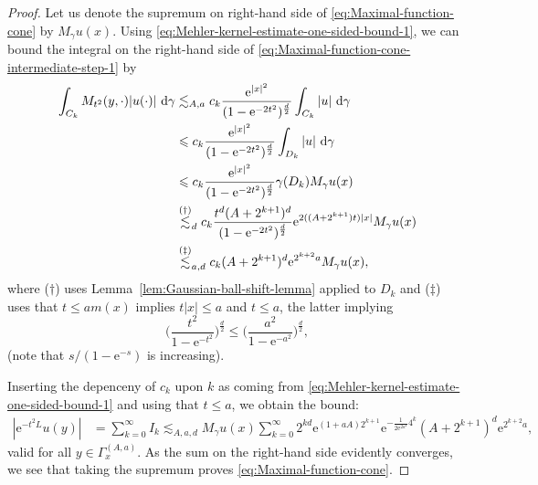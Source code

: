\documentclass{amsart}
\theoremstyle{remark}
\newcommand{\D}{\,\textup{d}}
\renewcommand{\leq}{\leqslant}
\newcommand{\e}{\mathrm{e}} %
\begin{document}
\begin{proof}
  Let us denote the supremum on right-hand side of
  \eqref{eq:Maximal-function-cone} by $M_\gamma u (x)$. Using
  \eqref{eq:Mehler-kernel-estimate-one-sided-bound-1}, we can bound the
  integral on the right-hand side of
  \eqref{eq:Maximal-function-cone-intermediate-step-1} by
  \begin{align*}
    \int_{C_k}  M_{t^2}(y, \cdot) |u(\cdot)| \,\D\gamma & \lesssim_{A, a}
    c_k \frac{\e^{|x|^2}}{(1 - \e^{-2t^2})^{\frac{d}2}}   \int_{C_k}
    |u| \,\D\gamma\\ 
    &\leq c_k \frac {\e^{|x|^2}} {(1 -
      \e^{-2t^2})^{\frac{d}2}} \int_{D_k} |u| \,\D\gamma\\ 
    &\leq c_k  \frac {\e^{|x|^2}}{(1 - \e^{-2t^2})^{\frac{d}2}}  \gamma(D_k) M_\gamma u(x)\\
    &\overset{(\dagger)}{\lesssim}_d c_k 
    \frac {t^d (A + 2^{k + 1})^d}{(1 - \e^{-2t^2})^{\frac{d}2}} \e^{2((A +2^{k + 1})t)|x|} M_\gamma u(x)\\
    &\overset{(\ddagger)}{\lesssim}_{a, d} c_k (A + 2^{k + 1})^d \e^{2^{k + 2} a} M_\gamma u(x),
  \end{align*}
  where ($\dagger$) uses Lemma~\ref{lem:Gaussian-ball-shift-lemma} applied to
  $D_k$ and ($\ddagger$) uses that $t \leq am(x)$ implies $t|x|\leq a$ and
  $t\leq a$, the latter implying 
 \begin{equation*}
    \biggl(\frac{t^2}{1 - \e^{-t^2}} \biggr)^{\frac{d}2} \leq
    \biggl(\frac{a^2}{1 - \e^{-a^2}} \biggr)^{\frac{d}2},
  \end{equation*}
  (note that $s/(1-\e^{-s})$ is increasing).

  Inserting the depenceny of $c_k$ upon $k$ as coming from 
  \eqref{eq:Mehler-kernel-estimate-one-sided-bound-1} and using that $t\leq a$,
  we obtain the bound: 
  \begin{align*}
    |\e^{-t^2 L} u(y)| &= \sum_{k = 0}^\infty I_k
    \lesssim_{A,a,d} M_\gamma u(x) \sum_{k = 0}^\infty 2^{kd} \e^{(1+aA) 2^{k + 1}} 
    \e^{-\frac1{2 \e^{2a^2}}  4^k} (A + 2^{k + 1})^d \e^{ 2^{k + 2} a},
  \end{align*}
  valid for all $y \in \Gamma_x^{(A, a)}$. As the sum on the right-hand side
  evidently converges, we see that taking the supremum proves
  \eqref{eq:Maximal-function-cone}.
\end{proof}


\end{document}
